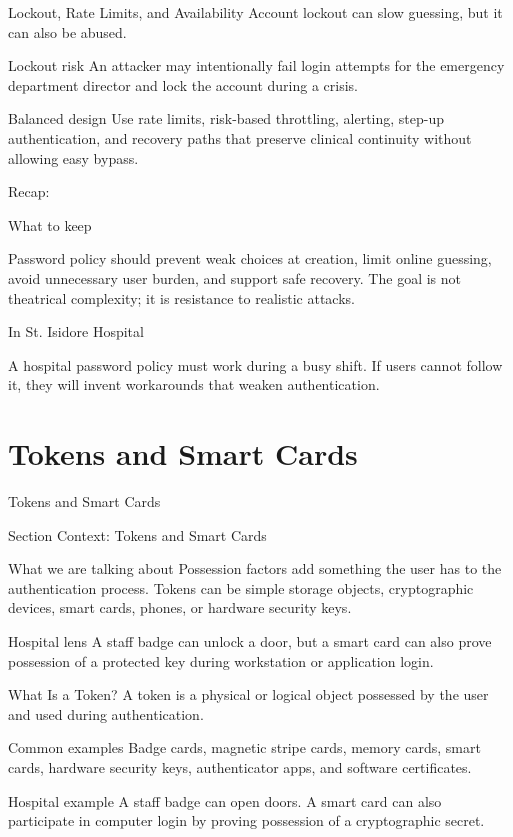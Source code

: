 \documentclass[presentation]{beamer}
\newcommand{\sectiontitleframe}[1]{
\begin{frame}[plain,c]
\begin{center}
{\usebeamerfont{title}\usebeamercolor[fg]{title}#1}
\end{center}
\end{frame}
}
\newcommand{\scenario}{St. Isidore Hospital}
\newcommand{\takeawaysframe}[2]{
  \begin{frame}[c]{Recap: \insertsection}
    \begin{block}{What to keep}
      #1
    \end{block}
    \begin{exampleblock}{In \scenario}
      #2
    \end{exampleblock}
  \end{frame}
}
\begin{document}
\begin{frame}[c]{Lockout, Rate Limits, and Availability}
  Account lockout can slow guessing, but it can also be abused.

  \begin{block}{Lockout risk}
    An attacker may intentionally fail login attempts for the emergency department director and lock the account during a crisis.
  \end{block}

  \begin{block}{Balanced design}
    Use rate limits, risk-based throttling, alerting, step-up authentication, and recovery paths that preserve clinical continuity without allowing easy bypass.
  \end{block}
\end{frame}

\takeawaysframe{
  Password policy should prevent weak choices at creation, limit online guessing, avoid unnecessary user burden, and support safe recovery. The goal is not theatrical complexity; it is resistance to realistic attacks.
}{
  A hospital password policy must work during a busy shift. If users cannot follow it, they will invent workarounds that weaken authentication.
}

\section{Tokens and Smart Cards}
\sectiontitleframe{Tokens and Smart Cards}

\begin{frame}[c]{Section Context: Tokens and Smart Cards}
\begin{block}{What we are talking about}
Possession factors add something the user has to the authentication process. Tokens can be simple
storage objects, cryptographic devices, smart cards, phones, or hardware security keys.
\end{block}

\begin{exampleblock}{Hospital lens}
A staff badge can unlock a door, but a smart card can also prove possession of a protected key
during workstation or application login.
\end{exampleblock}
\end{frame}

\begin{frame}[c]{What Is a Token?}
  A token is a physical or logical object possessed by the user and used during authentication.

  \begin{block}{Common examples}
    Badge cards, magnetic stripe cards, memory cards, smart cards, hardware security keys, authenticator apps, and software certificates.
  \end{block}

  \begin{exampleblock}{Hospital example}
    A staff badge can open doors. A smart card can also participate in computer login by proving possession of a cryptographic secret.
  \end{exampleblock}
\end{frame}
\end{document}
